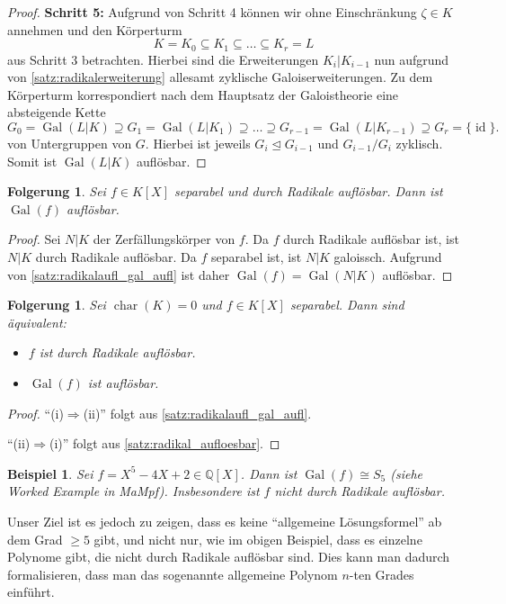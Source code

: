 \documentclass[a4paper, twoside, 11pt, ngerman]{report}
\newcommand{\QQ}{\mathds Q}
\DeclareMathOperator{\charact}{char}
\DeclareMathOperator{\Gal}{Gal}
\theoremstyle{definistyle}
\newtheorem{folgerung}[satz]{Folgerung}
\newtheorem{bsp}[satz]{Beispiel}
\theoremstyle{remark}
\begin{document}
\begin{proof}
\textbf{Schritt 5:} Aufgrund von Schritt 4 können wir ohne Einschränkung $\zeta \in K$
annehmen und den Körperturm 
\[
K = K_0 \subseteq K_1 \subseteq \ldots \subseteq K_r = L 
\]
aus Schritt 3 betrachten. Hierbei sind die Erweiterungen $K_i|K_{i-1}$ nun aufgrund von 
\ref{satz:radikalerweiterung} allesamt zyklische Galoiserweiterungen. Zu dem Körperturm korrespondiert nach dem Hauptsatz der Galoistheorie eine absteigende Kette  
\[
G_0 = \Gal(L|K) \supseteq G_1 = \Gal(L|K_1) \supseteq \ldots \supseteq G_{r-1} = \Gal(L|K_{r-1}) \supseteq G_r = \{\operatorname{id}\}.
\]
von Untergruppen von $G$. Hierbei ist jeweils $G_i \trianglelefteq G_{i-1}$ und $G_{i-1}/G_i$ zyklisch. Somit ist $\Gal(L|K)$ auflösbar. 
\end{proof}

\begin{folgerung}\label{folg:pol_radaufl_galaufl}
Sei $f \in K[X]$ separabel und durch Radikale auflösbar. Dann ist $\Gal(f)$ auflösbar.
\end{folgerung}

\begin{proof}
Sei $N|K$ der Zerfällungskörper von $f$. Da $f$ durch Radikale auflösbar ist, ist
$N|K$ durch Radikale auflösbar. Da $f$ separabel ist, ist $N|K$ galoissch.
Aufgrund von \ref{satz:radikalaufl_gal_aufl} ist daher $\Gal(f) = \Gal(N|K)$
auflösbar.
\end{proof}

\begin{folgerung}
Sei $\charact(K) = 0$ und $f \in K[X]$ separabel. Dann sind äquivalent:
\begin{itemize}
    \item[(i)] $f$ ist durch Radikale auflösbar.
    \item[(ii)] $\Gal(f)$ ist auflösbar.
\end{itemize}
\end{folgerung}

\begin{proof}
"`(i)$\Rightarrow$(ii)"' folgt aus \ref{satz:radikalaufl_gal_aufl}.

"`(ii)$\Rightarrow$(i)"' folgt aus \ref{satz:radikal_aufloesbar}.
\end{proof}

\begin{bsp}
Sei $f = X^5 - 4X + 2 \in \QQ[X]$. Dann ist $\Gal(f) \cong S_5$ (siehe Worked Example
in MaMpf). Insbesondere ist $f$ nicht durch Radikale auflösbar.
\end{bsp}

Unser Ziel ist es jedoch zu zeigen, dass es keine "`allgemeine Lösungsformel"'
ab dem Grad $\geq 5$ gibt, und nicht nur, wie im obigen Beispiel, dass es einzelne Polynome gibt, die nicht durch Radikale auflösbar sind. Dies kann man dadurch formalisieren, dass man 
das sogenannte allgemeine Polynom $n$-ten Grades einführt.
\end{document}
